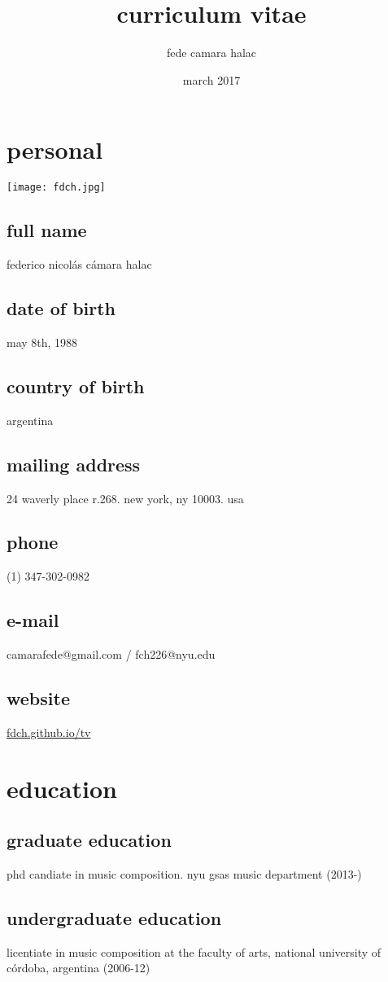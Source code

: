 \documentclass{book}
\title{curriculum vitae}
\author{fede camara halac}
\date{march 2017}
\begin{document}
\maketitle
\section {personal}
\texttt{[image: fdch.jpg]}
\subsection{full name}
federico nicolás cámara halac
\subsection{date of birth}
may 8th, 1988
\subsection{country of birth}
argentina
\subsection{mailing address}
24 waverly place r.268. new york, ny 10003. usa
\subsection{phone}
(1) 347-302-0982
\subsection{e-mail}
camarafede@gmail.com / fch226@nyu.edu
\subsection{website}
\href{http://fdch.github.io/tv}{fdch.github.io/tv}
\newpage
\section{education}
\subsection{graduate education}
phd candiate in music composition. nyu gsas music department (2013-)
\subsection{undergraduate education}
licentiate in music composition at the faculty of arts, national university of córdoba, argentina (2006-12)
\end{document}
